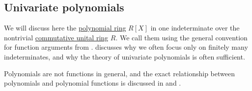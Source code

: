 \subsection{Univariate polynomials}\label{subsec:univariate_polynomials}

We will discuss here the \hyperref[def:polynomial_semiring]{polynomial ring} \( R[X] \) in one indeterminate over the nontrivial \hyperref[def:ring/commutative]{commutative unital ring} \( R \). We call them  using the general convention for function arguments from .  discusses why we often focus only on finitely many indeterminates, and why the theory of univariate polynomials is often sufficient.

Polynomials are not functions in general, and the exact relationship between polynomials and polynomial functions is discussed in  and .

